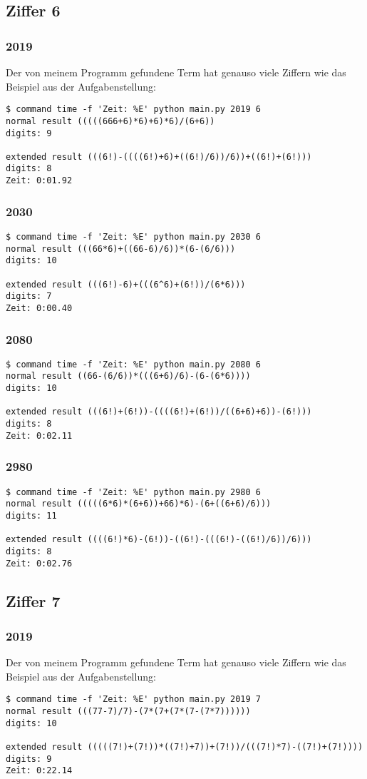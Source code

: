 \subsection{Ziffer 6}
\subsubsection{2019}
Der von meinem Programm gefundene Term hat genauso viele Ziffern wie das Beispiel aus der Aufgabenstellung:
\begin{lstlisting}
$ command time -f 'Zeit: %E' python main.py 2019 6
normal result (((((666+6)*6)+6)*6)/(6+6))
digits: 9

extended result (((6!)-((((6!)+6)+((6!)/6))/6))+((6!)+(6!)))
digits: 8
Zeit: 0:01.92
\end{lstlisting}
\subsubsection{2030}
\begin{lstlisting}
$ command time -f 'Zeit: %E' python main.py 2030 6
normal result (((66*6)+((66-6)/6))*(6-(6/6)))
digits: 10

extended result (((6!)-6)+(((6^6)+(6!))/(6*6)))
digits: 7
Zeit: 0:00.40
\end{lstlisting}
\subsubsection{2080}
\begin{lstlisting}
$ command time -f 'Zeit: %E' python main.py 2080 6
normal result ((66-(6/6))*(((6+6)/6)-(6-(6*6))))
digits: 10

extended result (((6!)+(6!))-((((6!)+(6!))/((6+6)+6))-(6!)))
digits: 8
Zeit: 0:02.11
\end{lstlisting}
\subsubsection{2980}
\begin{lstlisting}
$ command time -f 'Zeit: %E' python main.py 2980 6
normal result (((((6*6)*(6+6))+66)*6)-(6+((6+6)/6)))
digits: 11

extended result ((((6!)*6)-(6!))-((6!)-(((6!)-((6!)/6))/6)))
digits: 8
Zeit: 0:02.76
\end{lstlisting}
\subsection{Ziffer 7}
\subsubsection{2019}
Der von meinem Programm gefundene Term hat genauso viele Ziffern wie das Beispiel aus der Aufgabenstellung:
\begin{lstlisting}
$ command time -f 'Zeit: %E' python main.py 2019 7
normal result (((77-7)/7)-(7*(7+(7*(7-(7*7))))))
digits: 10

extended result (((((7!)+(7!))*((7!)+7))+(7!))/(((7!)*7)-((7!)+(7!))))
digits: 9
Zeit: 0:22.14
\end{lstlisting}
